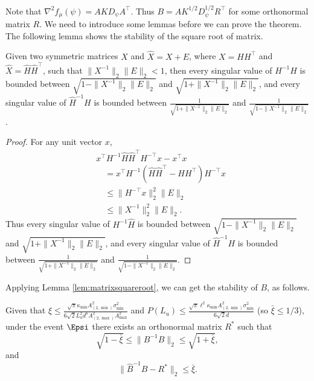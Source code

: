 Note that $\nabla^2f_{\mu}(\psi) = AKD_{\psi}A^{\top}$. Thus $B = AK^{1/2}D_{\psi}^{1/2}R^{\top}$ for some orthonormal matrix $R$. 
We need to introduce some lemmas before we can prove the theorem. 
The following lemma shows the stability of the square root of matrix.
\begin{lemma}
\label{lem:matrixsquareroot}
Given two symmetric matrices $X$ and $\hat{X} = X + E$, where $X = HH^{\top}$ and $\hat{X} = \hat{H}\hat{H}^{\top}$, such that $\|X^{-1}\|_2 \|E\|_2 < 1$, then every singular value of $H^{-1}\hat{H}$ is bounded between $\sqrt{1- \|X^{-1}\|_2 \|E\|_2}$ and $\sqrt{1+ \|X^{-1}\|_2 \|E\|_2}$, 
and every singular value of $\hat{H}^{-1}H$ is bounded between $\frac{1}{\sqrt{1 + \|X^{-1}\|_2 \|E\|_2}}$ and $\frac{1}{\sqrt{1 - \|X^{-1}\|_2 \|E\|_2}}$. 
\end{lemma}
\begin{proof}
For any unit vector $x$,
\begin{align*}
& x^{\top}H^{-1}\hat{H}\hat{H}^{\top}H^{-\top}x - x^{\top}x\\
& \quad = x^{\top}H^{-1}\left( \hat{H}\hat{H}^{\top} - HH^{\top}\right)H^{-\top}x \\
& \quad \le \|H^{-\top}x\|^2_2 \|E\|_2 \\
& \quad \le \|X^{-1}\|_2^2 \|E\|_2.
\end{align*}
Thus every singular value of $H^{-1}\hat{H}$ is bounded between $\sqrt{1- \|X^{-1}\|_2 \|E\|_2}$ and $\sqrt{1+ \|X^{-1}\|_2 \|E\|_2}$, 
and every singular value of $\hat{H}^{-1}H$ is bounded between $\frac{1}{\sqrt{1 + \|X^{-1}\|_2 \|E\|_2}}$ and $\frac{1}{\sqrt{1 - \|X^{-1}\|_2 \|E\|_2}}$.
\end{proof}
Applying Lemma \ref{lem:matrixsquareroot}, we can get the stability of $B$, as follows.
\begin{lemma}
\label{lem:BhatinverseB}
Given that $\xi \le \frac{\sqrt{\pi}\kappa_{\min}A^2_{(2,\min)}\sigma_{\min}^2}{6\sqrt{2}L_u^2d^6A_{(2,\max)}^2A_{\max}^2}$ and $P(L_u)\le \frac{\sqrt{\pi}\ell^2\kappa_{\min}A^2_{(2,\min)}\sigma_{\min}^2}{6\sqrt{2}d}$
(so $\bar{\xi} \le 1/3$), under the event $\Epsi$ there exists an orthonormal matrix $R^*$ such that 
 \[
 \sqrt{1-\bar{\xi}} \le \|B^{-1}\hat{B}\|_2 \le \sqrt{1+\bar{\xi}},
 \]
 and
\[
\|\hat{B}^{-1}B - R^*\|_2 \le \bar{\xi}.
\]
\end{lemma}
